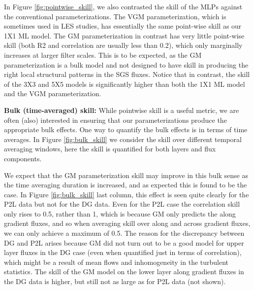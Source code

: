 \documentclass[draft]{agujournal2019}
\begin{document}
In Figure \ref{fig:pointwise_skill}, we also contrasted the skill of the MLPs against the conventional parameterizations. 
The VGM parameterization, which is sometimes used in LES studies, has essentially the same point-wise skill as our 1X1 ML model. The GM parameterization in contrast has very little point-wise skill (both R2 and correlation are usually less than 0.2), which only marginally increases at larger filter scales. This is to be expected, as the GM parameterization is a bulk model and not designed to have skill in producing the right local structural patterns in the SGS fluxes. Notice that in contrast, the skill of the 3X3 and 5X5 models is significantly higher than both the 1X1 ML model and the VGM parameterization. 

\textbf{Bulk (time-averaged) skill:}
While pointwise skill is a useful metric, we are often (also) interested in ensuring that our parameterizations produce the appropriate bulk effects. One way to quantify the bulk effects is in terms of time averages. In Figure \ref{fig:bulk_skill} we consider the skill over different temporal averaging windows, here the skill is quantified for both layers and flux components. 

We expect that the GM parameterization skill may improve in this bulk sense as the time averaging duration is increased, and as expected this is found to be the case. In Figure \ref{fig:bulk_skill} last column, this effect is seen quite clearly for the P2L data but not for the DG data. Even for the P2L case the correlation skill only rises to 0.5, rather than 1, which is because GM only predicts the along gradient fluxes, and so when averaging skill over along and across gradient fluxes, we can only achieve a maximum of 0.5. The reason for the discrepancy between DG and P2L arises because GM did not turn out to be a good model for upper layer fluxes in the DG case (even when quantified just in terms of correlation), which might be a result of mean flows and inhomogeneity in the turbulent statistics. The skill of the GM model on the lower layer along gradient fluxes in the DG data is higher, but still not as large as for P2L data (not shown).
\end{document}
